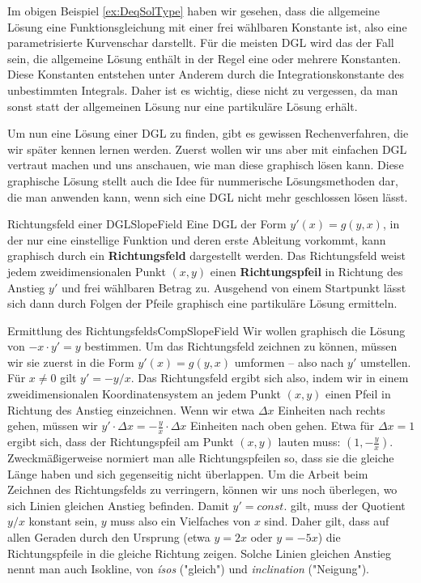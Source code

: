 Im obigen Beispiel \ref{ex:DeqSolType} haben wir gesehen, dass die allgemeine Lösung eine Funktionsgleichung mit einer frei wählbaren Konstante ist, also eine parametrisierte Kurvenschar darstellt. Für die meisten DGL wird das der Fall sein, die allgemeine Lösung enthält in der Regel eine oder mehrere Konstanten. Diese Konstanten entstehen unter Anderem durch die Integrationskonstante des unbestimmten Integrals. Daher ist es wichtig, diese nicht zu vergessen, da man sonst statt der allgemeinen Lösung nur eine partikuläre Lösung erhält.

Um nun eine Lösung einer DGL zu finden, gibt es gewissen Rechenverfahren, die wir später kennen lernen werden. Zuerst wollen wir uns aber mit einfachen DGL vertraut machen und uns anschauen, wie man diese graphisch lösen kann. Diese graphische Lösung stellt auch die Idee für nummerische Lösungsmethoden dar, die man anwenden kann, wenn sich eine DGL nicht mehr geschlossen lösen lässt.

\begin{definition}{Richtungsfeld einer DGL}{SlopeField}
    Eine DGL der Form $y'(x) = g(y,x)$, in der nur eine einstellige Funktion und deren erste Ableitung vorkommt, kann graphisch durch ein \textbf{Richtungsfeld} dargestellt werden. Das Richtungsfeld weist jedem zweidimensionalen Punkt $(x,y)$ einen \textbf{Richtungspfeil} in Richtung des Anstieg $y'$ und frei wählbaren Betrag zu. Ausgehend von einem Startpunkt lässt sich dann durch Folgen der Pfeile graphisch eine partikuläre Lösung ermitteln.
\end{definition}

\begin{example}{Ermittlung des Richtungsfelds}{CompSlopeField}
    Wir wollen graphisch die Lösung von $-x \cdot y'=y$ bestimmen. Um das Richtungsfeld zeichnen zu können, müssen wir sie zuerst in die Form $y'(x) = g(y,x)$ umformen -- also nach $y'$ umstellen. Für $x \ne 0$ gilt $y' = -y/x$. Das Richtungsfeld ergibt sich also, indem wir in einem zweidimensionalen Koordinatensystem an jedem Punkt $(x,y)$ einen Pfeil in Richtung des Anstieg einzeichnen. Wenn wir etwa $\Delta x$ Einheiten nach rechts gehen, müssen wir $y' \cdot \Delta x = -\frac{y}{x} \cdot \Delta x$ Einheiten nach oben gehen. Etwa für $\Delta x = 1$ ergibt sich, dass der Richtungspfeil am Punkt $(x,y)$ lauten muss: $(1,-\frac{y}{x})$. Zweckmäßigerweise normiert man alle Richtungspfeilen so, dass sie die gleiche Länge haben und sich gegenseitig nicht überlappen.
    Um die Arbeit beim Zeichnen des Richtungsfelds zu verringern, können wir uns noch überlegen, wo sich Linien gleichen Anstieg befinden. Damit $y'=const.$ gilt, muss der Quotient $y/x$ konstant sein, $y$ muss also ein Vielfaches von $x$ sind. Daher gilt, dass auf allen Geraden durch den Ursprung (etwa $y=2x$ oder $y=-5x$) die Richtungspfeile in die gleiche Richtung zeigen. Solche Linien gleichen Anstieg nennt man auch Isokline, von \emph{ísos} ("gleich") und \emph{inclination} ("Neigung").
\end{example}

